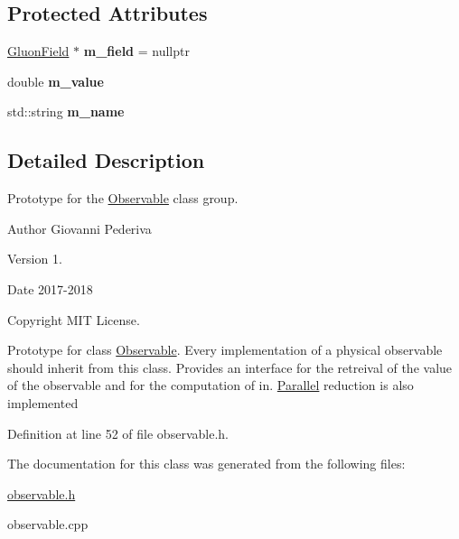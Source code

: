 \subsection*{Protected Attributes}
\begin{DoxyCompactItemize}
\item 
\hyperlink{field_8h_afe80b127697eba6d6e7fbd8121c8d4ee}{Gluon\+Field} $\ast$ {\bfseries m\+\_\+field} = nullptr\hypertarget{classObservable_a3f3b97a6ccf3662fc4285e0249fc7e55}{}\label{classObservable_a3f3b97a6ccf3662fc4285e0249fc7e55}

\item 
double {\bfseries m\+\_\+value}\hypertarget{classObservable_a65689c61e83937902110f9da43b4a327}{}\label{classObservable_a65689c61e83937902110f9da43b4a327}

\item 
std\+::string {\bfseries m\+\_\+name}\hypertarget{classObservable_ac48d8fce3be9fefa7af3bb3cd4e01e06}{}\label{classObservable_ac48d8fce3be9fefa7af3bb3cd4e01e06}

\end{DoxyCompactItemize}


\subsection{Detailed Description}
Prototype for the \hyperlink{classObservable}{Observable} class group. 

\begin{DoxyAuthor}{Author}
Giovanni Pederiva 
\end{DoxyAuthor}
\begin{DoxyVersion}{Version}
1. 
\end{DoxyVersion}
\begin{DoxyDate}{Date}
2017-\/2018 
\end{DoxyDate}
\begin{DoxyCopyright}{Copyright}
M\+IT License.
\end{DoxyCopyright}
Prototype for class \hyperlink{classObservable}{Observable}. Every implementation of a physical observable should inherit from this class. Provides an interface for the retreival of the value of the observable and for the computation of in. \hyperlink{classParallel}{Parallel} reduction is also implemented 

Definition at line 52 of file observable.\+h.



The documentation for this class was generated from the following files\+:\begin{DoxyCompactItemize}
\item 
\hyperlink{observable_8h}{observable.\+h}\item 
observable.\+cpp\end{DoxyCompactItemize}
